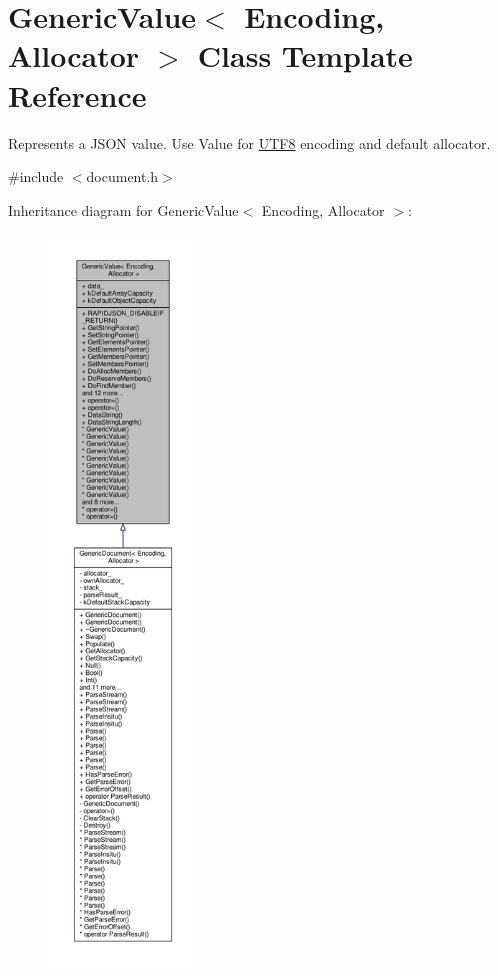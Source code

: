 \hypertarget{classGenericValue}{}\section{Generic\+Value$<$ Encoding, Allocator $>$ Class Template Reference}
\label{classGenericValue}


Represents a J\+S\+ON value. Use Value for \hyperlink{structUTF8}{U\+T\+F8} encoding and default allocator.  




{\ttfamily \#include $<$document.\+h$>$}



Inheritance diagram for Generic\+Value$<$ Encoding, Allocator $>$\+:
\nopagebreak
\begin{figure}[H]
\begin{center}
\leavevmode
\includegraphics[height=550pt]{classGenericValue__inherit__graph}
\end{center}
\end{figure}


